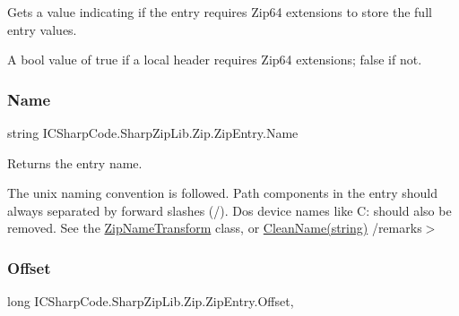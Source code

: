 Gets a value indicating if the entry requires Zip64 extensions to store the full entry values. 

A bool value of true if a local header requires Zip64 extensions; false if not.\mbox{\label{class_i_c_sharp_code_1_1_sharp_zip_lib_1_1_zip_1_1_zip_entry_af515c85f6f5599b4c0650e2ea63230ac}} 
\subsubsection{\texorpdfstring{Name}{Name}}
{\footnotesize\ttfamily string I\+C\+Sharp\+Code.\+Sharp\+Zip\+Lib.\+Zip.\+Zip\+Entry.\+Name\hspace{0.3cm}{\ttfamily [get]}}



Returns the entry name. 

The unix naming convention is followed. Path components in the entry should always separated by forward slashes (\textquotesingle{}/\textquotesingle{}). Dos device names like C\+: should also be removed. See the \hyperlink{class_i_c_sharp_code_1_1_sharp_zip_lib_1_1_zip_1_1_zip_name_transform}{Zip\+Name\+Transform} class, or \hyperlink{class_i_c_sharp_code_1_1_sharp_zip_lib_1_1_zip_1_1_zip_entry_a1eb0c6159ce91d0303ab617c109b6b0d}{Clean\+Name(string)} /remarks$>$ \mbox{\label{class_i_c_sharp_code_1_1_sharp_zip_lib_1_1_zip_1_1_zip_entry_aa894f4cc56f28830e656744343a669dc}} 
\subsubsection{\texorpdfstring{Offset}{Offset}}
{\footnotesize\ttfamily long I\+C\+Sharp\+Code.\+Sharp\+Zip\+Lib.\+Zip.\+Zip\+Entry.\+Offset\hspace{0.3cm}{\ttfamily [get]}, {\ttfamily [set]}}



